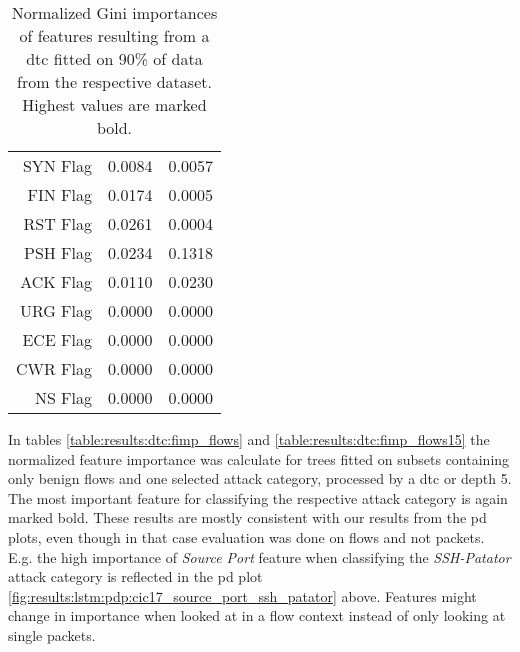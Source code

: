 \begin{table}[htbp]
\begin{tabular}{r|c|c}
		SYN Flag          & 0.0084                                                                   & 0.0057                                                                \\
		FIN Flag          & 0.0174                                                                   & 0.0005                                                                \\
		RST Flag          & 0.0261                                                                   & 0.0004                                                                \\
		PSH Flag          & 0.0234                                                                   & 0.1318                                                                \\
		ACK Flag          & 0.0110                                                                   & 0.0230                                                                \\
		URG Flag          & 0.0000                                                                   & 0.0000                                                                \\
		ECE Flag          & 0.0000                                                                   & 0.0000                                                                \\
		CWR Flag          & 0.0000                                                                   & 0.0000                                                                \\
		NS Flag           & 0.0000                                                                   & 0.0000                                                               
	\end{tabular}
	\caption{Normalized Gini importances of features resulting from a \gls{dtc} fitted on 90\% of data from the respective dataset. Highest values are marked bold.}
	\label{table:results:expl:fimp_90_ds}
\end{table}





In tables \ref{table:results:dtc:fimp_flows} and \ref{table:results:dtc:fimp_flows15} the normalized feature importance was calculate for trees fitted on subsets containing only benign flows and one selected attack category, processed by a \gls{dtc} or depth 5. The most important feature for classifying the respective attack category is again marked bold. These results are mostly consistent with our results from the \gls{pd} plots, even though in that case evaluation was done on flows and not packets. E.g. the high importance of \textit{Source Port} feature when classifying the \textit{SSH-Patator} attack category is reflected in the \gls{pd} plot  \ref{fig:results:lstm:pdp:cic17_source_port_ssh_patator} above. Features might change in importance when looked at in a flow context instead of only looking at single packets.

\newpage
